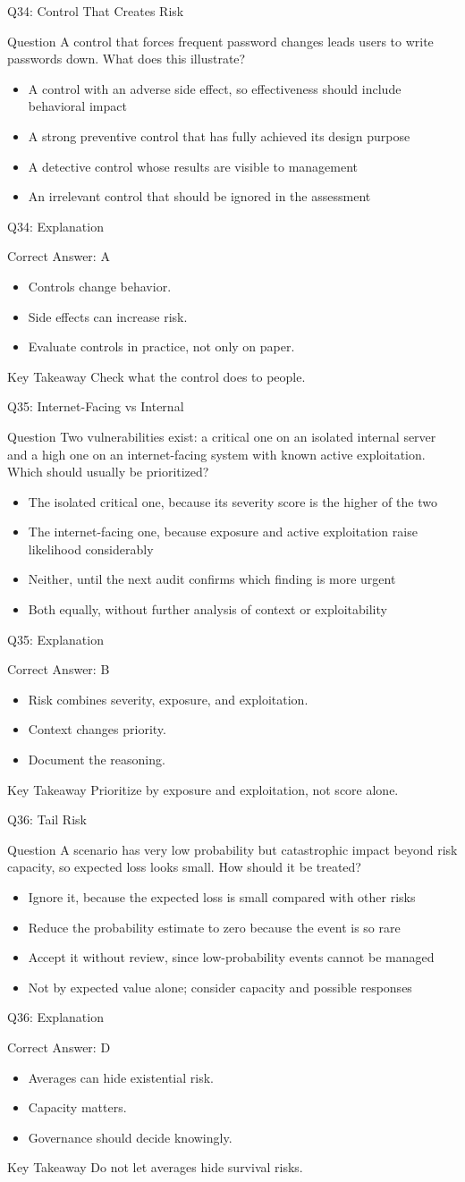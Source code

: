 \documentclass[aspectratio=169]{beamer}
\newcommand{\hq}[7]{%
	\begin{frame}{Q#1: #2}
		\begin{block}{Question}
			#3
		\end{block}
		\begin{itemize}
			#4
		\end{itemize}
	\end{frame}
	\begin{frame}{Q#1: Explanation}
		\begin{block}{Correct Answer: #5}
			\begin{itemize}
				#6
			\end{itemize}
		\end{block}
		\begin{alertblock}{Key Takeaway}
			#7
		\end{alertblock}
	\end{frame}
}
\begin{document}
	\hq{34}{Control That Creates Risk}
	{A control that forces frequent password changes leads users to write passwords down. What does this illustrate?}
	{\item[\textbf{(A)}] A control with an adverse side effect, so effectiveness should include behavioral impact
		\item[\textbf{(B)}] A strong preventive control that has fully achieved its design purpose
		\item[\textbf{(C)}] A detective control whose results are visible to management
		\item[\textbf{(D)}] An irrelevant control that should be ignored in the assessment}
	{A}
	{\item Controls change behavior.
		\item Side effects can increase risk.
		\item Evaluate controls in practice, not only on paper.}
	{Check what the control does to people.}

	\hq{35}{Internet-Facing vs Internal}
	{Two vulnerabilities exist: a critical one on an isolated internal server and a high one on an internet-facing system with known active exploitation. Which should usually be prioritized?}
	{\item[\textbf{(A)}] The isolated critical one, because its severity score is the higher of the two
		\item[\textbf{(B)}] The internet-facing one, because exposure and active exploitation raise likelihood considerably
		\item[\textbf{(C)}] Neither, until the next audit confirms which finding is more urgent
		\item[\textbf{(D)}] Both equally, without further analysis of context or exploitability}
	{B}
	{\item Risk combines severity, exposure, and exploitation.
		\item Context changes priority.
		\item Document the reasoning.}
	{Prioritize by exposure and exploitation, not score alone.}

	\hq{36}{Tail Risk}
	{A scenario has very low probability but catastrophic impact beyond risk capacity, so expected loss looks small. How should it be treated?}
	{\item[\textbf{(A)}] Ignore it, because the expected loss is small compared with other risks
		\item[\textbf{(B)}] Reduce the probability estimate to zero because the event is so rare
		\item[\textbf{(C)}] Accept it without review, since low-probability events cannot be managed
		\item[\textbf{(D)}] Not by expected value alone; consider capacity and possible responses}
	{D}
	{\item Averages can hide existential risk.
		\item Capacity matters.
		\item Governance should decide knowingly.}
	{Do not let averages hide survival risks.}
\end{document}
